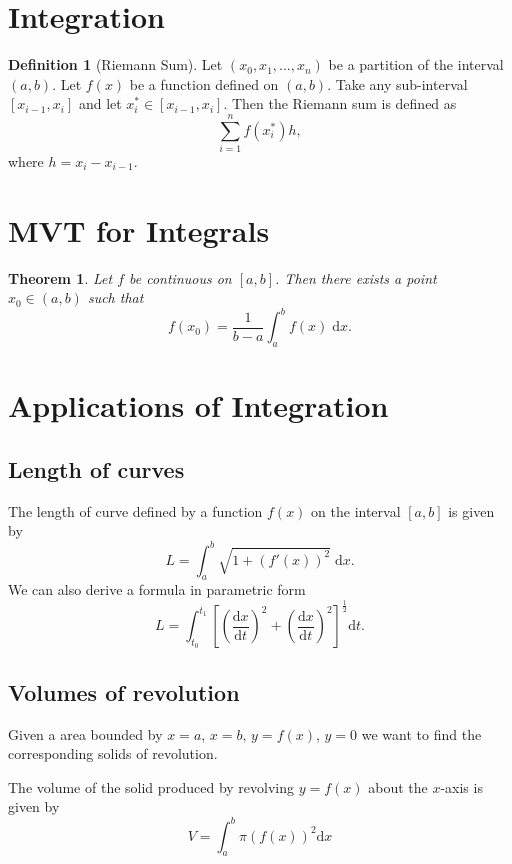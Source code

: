 \documentclass[11pt,a4paper]{article}
\newcommand\dee{\text{d}}
\newtheorem{theorem}{Theorem}
\theoremstyle{definition}
\newtheorem{definition}{Definition}
\begin{document}
\section{Integration}

\begin{definition}[Riemann Sum]
   Let $(x_0, x_1, ..., x_n) $ be a partition of the interval $(a,b)$. Let $ f(x) $ be a function defined on $ (a, b) $. Take any sub-interval $ [x_{i - 1}, x_i] $ and let 
   $ x_i^* \in [x_{i - 1}, x_i] $. Then the Riemann sum is defined as
   \[ \sum_{i = 1}^n f(x_i^*)h,\]
   where $ h = x_i - x_{i - 1}.$
\end{definition}

\section{MVT for Integrals}

\begin{theorem}
    Let $ f $ be continuous on $ [a, b] $. Then there exists a point $ x_0 \in (a, b) $ such that 
    \[ f(x_0) = \frac{1}{b - a} \int_a^b f(x) \; \dee x.\]
\end{theorem}

\section{Applications of Integration} 

\subsection{Length of curves}

The length of curve defined by a function $ f(x) $ on the interval $ [a, b] $ is given by 
\[ L = \int_a^b \sqrt{1 + (f'(x))^2} \; \dee x.\]
We can also derive a formula in parametric form 
\[ L = \int_{t_0}^{t_1} \left[\left(\frac{\dee x}{\dee t}\right)^2 + \left(\frac{\dee x}{\dee t}\right)^2 \right]^{\frac{1}{2}}\dee t.\]

\subsection{Volumes of revolution}

Given a area bounded by $ x = a $, $ x = b $, $ y = f(x) $, $ y = 0 $ we want to find the corresponding solids of revolution.

The volume of the solid produced by revolving  $ y = f(x) $ about the $x$-axis is given by
\[ V = \int_a^b \pi (f(x))^2 \dee x\]
\end{document}
